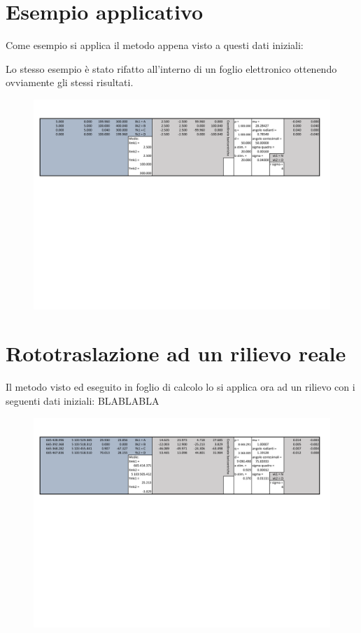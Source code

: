 \section{Esempio applicativo}
Come esempio si applica il metodo appena visto a questi dati iniziali:


Lo stesso esempio è stato rifatto all'interno di un foglio elettronico ottenendo ovviamente gli stessi risultati.
\begin{figure}[H]
\centering
\includegraphics[width=16cm]{documents/rototraslazioneEsempio.pdf}
\end{figure}
\section{Rototraslazione ad un rilievo reale}
Il metodo visto ed eseguito in foglio di calcolo lo si applica ora ad un rilievo con i seguenti dati iniziali:
BLABLABLA
\begin{figure}[H]
\centering
\includegraphics[width=16cm]{documents/rototraslazioneRilievo.pdf}
\end{figure}
	
